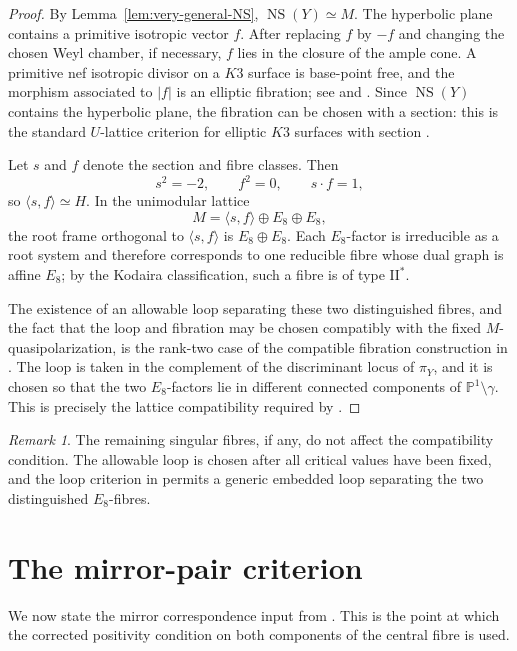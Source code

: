 \documentclass[11pt]{amsart}
\theoremstyle{definition}
\theoremstyle{remark}
\newtheorem{remark}[theorem]{Remark}
\DeclareMathOperator{\NS}{NS}
\newcommand{\PP}{\mathbb{P}}
\begin{document}
\begin{proof}
By Lemma~\ref{lem:very-general-NS}, $\NS(Y)\simeq M$.  The hyperbolic plane
contains a primitive isotropic vector $f$.  After replacing $f$ by $-f$ and
changing the chosen Weyl chamber, if necessary, $f$ lies in the closure of the
ample cone.  A primitive nef isotropic divisor on a $K3$ surface is
base-point free, and the morphism associated to $|f|$ is an elliptic
fibration; see \cite{saintdonat} and \cite[Chapter~2]{huybrechts}.  Since
$\NS(Y)$ contains the hyperbolic plane, the fibration can be chosen with a
section: this is the standard $U$-lattice criterion for elliptic $K3$
surfaces with section \cite[Chapter~11]{huybrechts}.

Let $s$ and $f$ denote the section and fibre classes.  Then
\[
s^2=-2,\qquad f^2=0,\qquad s\cdot f=1,
\]
so $\langle s,f\rangle\simeq H$.  In the unimodular lattice
\[
M=\langle s,f\rangle\oplus E_8\oplus E_8,
\]
the root frame orthogonal to $\langle s,f\rangle$ is $E_8\oplus E_8$.
Each $E_8$-factor is irreducible as a root system and therefore corresponds
to one reducible fibre whose dual graph is affine $E_8$; by the Kodaira
classification, such a fibre is of type $\mathrm{II}^*$.

The existence of an allowable loop separating these two distinguished fibres,
and the fact that the loop and fibration may be chosen compatibly with the
fixed $M$-quasipolarization, is the rank-two case of the compatible
fibration construction in \cite[\S4]{dfk3slpms}.  The loop is taken in the
complement of the discriminant locus of $\pi_Y$, and it is chosen so that
the two $E_8$-factors lie in different connected components of
$\PP^1\setminus\gamma$.  This is precisely the lattice compatibility
required by \cite[Definition~4.21]{dfk3slpms}.
\end{proof}

\begin{remark}
The remaining singular fibres, if any, do not affect the compatibility
condition.  The allowable loop is chosen after all critical values have been
fixed, and the loop criterion in \cite[\S4]{dfk3slpms} permits a generic
embedded loop separating the two distinguished $E_8$-fibres.
\end{remark}

\section{The mirror-pair criterion}

We now state the mirror correspondence input from
\cite{dfk3slpms}.  This is the point at which the corrected positivity
condition on both components of the central fibre is used.
\end{document}
